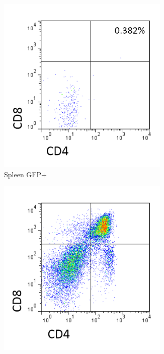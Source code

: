 \begin{figure}
	\begin{subfigure}{0.3\textwidth}
	\centering
	\includegraphics[width=0.9\textwidth]{Figures/SplnallposGFPpos.png}
	\caption{Spleen GFP+}
	\label{subfig:BMRAGCD19DP}
	\end{subfigure}
	\hfill
	\begin{subfigure}{0.3\textwidth}
	\centering
	\includegraphics[width=0.9\textwidth]{Figures/Tcellgate.png}

\end{subfigure}
\end{figure}
